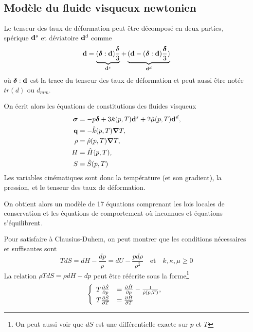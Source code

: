 \documentclass[a4paper,11pt]{report}
\newcommand{\bs}[1]{\boldsymbol{#1}}
\newcommand{\recip}[1]{\frac{1}{#1}}
\begin{document}
      \subsection{Modèle du fluide visqueux newtonien}
        Le tenseur des taux de déformation peut être décomposé en deux parties, spérique $\vb{d}^s$ et déviatoire $\vb{d}^d$ comme
        \begin{equation}
          \vb{d} = \underbrace{(\bs{\delta} : \vb{d}) \frac{\delta}{3}}_{\vb{d}^s} + \underbrace{(\vb{d} - (\bs{\delta}:\vb{d})\frac{\bs{\delta}}{3})}_{\vb{d}^d}
        \end{equation}
        où $\bs{\delta} : \vb{d}$ est la trace du tenseur des taux de déformation et peut aussi être notée $tr(d)$ ou $d_{mm}$.

        On écrit alors les équations de constitutions des fluides visqueux
        \begin{equation}
          \begin{aligned}
            \bs{\sigma} &= -p\bs{\delta} + 3 \hat{\kappa}(p,T) \vb{d}^s + 2 \hat{\mu}(p,T) \vb{d}^d,\\
            \vb{q} &= - \hat{k}(p, T) \grad T,\\
            \rho &= \hat{\rho}(p,T)\grad T,\\
            H &= \hat{H}(p,T),\\
            S &= \hat{S}(p,T)
          \end{aligned}
        \end{equation}
        Les variables cinématiques sont donc la température (et son gradient), la pression, et le tenseur des taux de déformation.

        On obtient alors un modèle de 17 équations comprenant les lois locales de conservation et les équations de comportement où inconnues et équations s'équilibrent.

        Pour satisfaire à Clausius-Duhem, on peut montrer que les conditions nécessaires et suffisantes sont
        \begin{equation}
          TdS = dH - \frac{dp}{\rho} = dU - \frac{pd\rho}{\rho^2}\quad \textrm{et} \quad k, \kappa, \mu \geq 0
        \end{equation}
        La relation $\rho T dS = \rho dH - dp$ peut être réécrite sous la forme\footnote{On peut aussi voir que $dS$ est une différentielle exacte sur $p$ et $T$}
        \begin{equation}
          \left\{
            \begin{array}{ll}
              T \pdv{\hat{S}}{p}(p,T) &= \pdv{\hat{H}}{p}(p, T) - \recip{\hat{\rho}(p,T)},\\
              T \pdv{\hat{S}}{T}(p,T) &= \pdv{\hat{H}}{T}(p,T)
            \end{array}
          \right.
        \end{equation}
\end{document}
